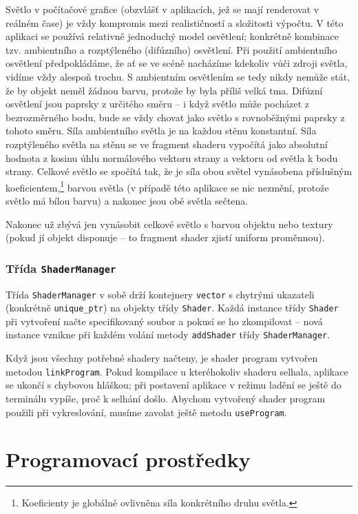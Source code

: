 \documentclass[a4paper, 11pt]{report}
\begin{document}
Světlo v počítačové grafice (obzvlášť v aplikacích, jež se mají renderovat v reálném čase) je vždy kompromis mezi realističností a složitosti výpočtu. V této aplikaci se používá relativně jednoduchý model osvětlení; konkrétně kombinace tzv. ambientního a rozptýleného (difúzního) osvětlení. Při použití ambientního osvětlení předpokládáme, že ať se ve scéně nacházíme kdekoliv vůči zdroji světla, vidíme vždy alespoň trochu. S ambientním osvětlením se tedy nikdy nemůže stát, že by objekt neměl žádnou barvu, protože by byla příliš velká tma. Difúzní osvětlení jsou paprsky z určitého směru -- i když světlo může pocházet z bezrozměrného bodu, bude se vždy chovat jako světlo s rovnoběžnými paprsky z tohoto směru. Síla ambientního světla je na každou stěnu konstantní. Síla rozptýleného světla na stěnu se ve fragment shaderu vypočítá jako absolutní hodnota z kosinu úhlu normálového vektoru strany a vektoru od světla k bodu strany. Celkové světlo se spočítá tak, že je síla obou světel vynásobena příslušným koeficientem,\footnote{Koeficienty je globálně ovlivněna síla konkrétního druhu světla.} barvou světla (v případě této aplikace se nic nezmění, protože světlo má bílou barvu) a nakonec jsou obě světla sečtena.

Nakonec už zbývá jen vynásobit celkové světlo s barvou objektu nebo textury (pokud jí objekt disponuje -- to fragment shader zjistí uniform proměnnou).

\subsection{Třída \texttt{ShaderManager}}
Třída \texttt{ShaderManager} v sobě drží kontejnery \texttt{vector} s chytrými ukazateli (konkrétně \texttt{unique\_ptr}) na objekty třídy \texttt{Shader}. Každá instance třídy \texttt{Shader} při vytvoření načte specifikovaný soubor a pokusí se ho zkompilovat -- nová instance vznikne při každém volání metody \texttt{addShader} třídy \texttt{ShaderManager}.

Když jsou všechny potřebné shadery načteny, je shader program vytvořen metodou \texttt{linkProgram}. Pokud kompilace u kteréhokoliv shaderu selhala, aplikace se ukončí s chybovou hláškou; při postavení aplikace v režimu ladění se ještě do terminálu vypíše, proč k selhání došlo. Abychom vytvořený shader program použili při vykreslování, musíme zavolat ještě metodu \texttt{useProgram}.

\chapter{Programovací prostředky}
\end{document}
